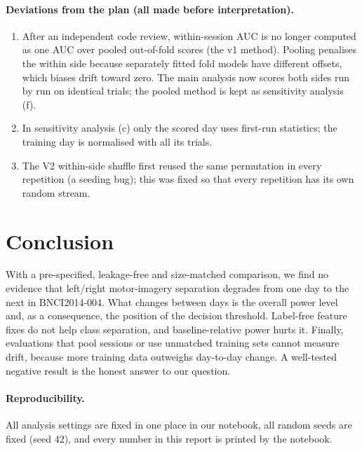 \documentclass[11pt,a4paper]{article}
\begin{document}
\paragraph{Deviations from the plan (all made before interpretation).}
\begin{enumerate}\itemsep0.1em
  \item After an independent code review, within-session AUC is no longer computed as one AUC over pooled out-of-fold scores (the
        v1 method). Pooling penalises the within side because separately fitted fold models have different offsets, which
        biases drift toward zero. The main analysis now scores both sides run by run on identical trials; the pooled method is
        kept as sensitivity analysis (f).
  \item In sensitivity analysis (c) only the scored day uses first-run statistics; the training day is normalised with all its trials.
  \item The V2 within-side shuffle first reused the same permutation in every repetition (a seeding bug); this was fixed so that
        every repetition has its own random stream.
\end{enumerate}

\section{Conclusion}
With a pre-specified, leakage-free and size-matched comparison, we find no evidence that left/right motor-imagery separation
degrades from one day to the next in BNCI2014-004. What changes between days is the overall power level and, as a consequence,
the position of the decision threshold. Label-free feature fixes do not help class separation, and baseline-relative power hurts it.
Finally, evaluations that pool sessions or use unmatched training sets cannot measure drift, because more training data outweighs
day-to-day change. A well-tested negative result is the honest answer to our question.

\paragraph{Reproducibility.} All analysis settings are fixed in one place in our notebook, all random seeds are fixed (seed 42), and
every number in this report is printed by the notebook.
\end{document}
